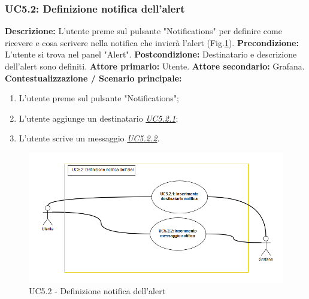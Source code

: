                         
                        
                    
                \subsubsection{UC5.2: Definizione notifica dell'alert }
                    \textbf{Descrizione:} L’utente preme sul pulsante "Notifications" per definire come ricevere e cosa scrivere nella notifica che invierà l'alert (Fig.\ref{uc5.2}).
                    \newline
                    \textbf{Precondizione:} L'utente si trova nel panel "Alert".
                    \newline
                    \textbf{Postcondizione:} Destinatario e descrizione dell'alert sono definiti.
                    \newline
                    \textbf{Attore primario:} Utente.
                    \newline
                    \textbf{Attore secondario:} Grafana.
                    \newline
                    \textbf{Contestualizzazione / Scenario principale:} \begin{enumerate}
                            \item L'utente preme sul pulsante "Notifications";
                            \item L'utente aggiunge un destinatario \underline{\textit{UC5.2.1}};
                            \item L'utente scrive un messaggio \underline{\textit{UC5.2.2}}.
                        \end{enumerate}
                        \clearpage
                        \begin{figure}[!htbp]
                    	\centering
                    	\includegraphics[width=\textwidth]{UC5-2.png}
                    	\caption{UC5.2 - Definizione notifica dell'alert}
                    	\label{uc5.2}
                    \end{figure}  
                        
